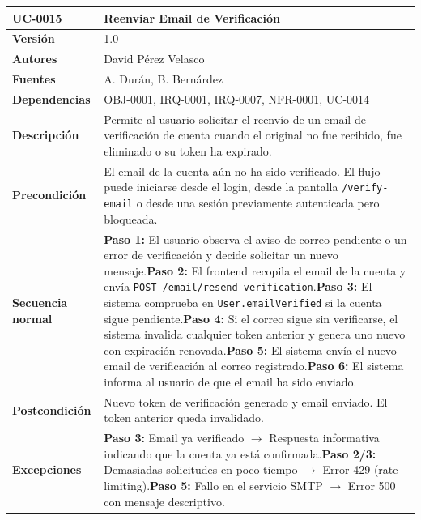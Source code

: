 \documentclass[11pt, a4paper]{article}
\begin{document}
\begin{longtable}{|p{4cm}|p{10cm}|}
\hline
\textbf{UC-0015} & Reenviar Email de Verificación \\
\hline
\textbf{Versión} & 1.0 \\
\hline
\textbf{Autores} & David Pérez Velasco \\
\hline
\textbf{Fuentes} & A. Durán, B. Bernárdez \\
\hline
\textbf{Dependencias} & OBJ-0001, IRQ-0001, IRQ-0007, NFR-0001, UC-0014 \\
\hline
\textbf{Descripción} & Permite al usuario solicitar el reenvío de un email de verificación de cuenta cuando el original no fue recibido, fue eliminado o su token ha expirado. \\
\hline
\textbf{Precondición} & El email de la cuenta aún no ha sido verificado. El flujo puede iniciarse desde el login, desde la pantalla \texttt{/verify-email} o desde una sesión previamente autenticada pero bloqueada. \\
\hline
\textbf{Secuencia normal} & \textbf{Paso 1:} El usuario observa el aviso de correo pendiente o un error de verificación y decide solicitar un nuevo mensaje.\newline\textbf{Paso 2:} El frontend recopila el email de la cuenta y envía \texttt{POST /email/resend-verification}.\newline\textbf{Paso 3:} El sistema comprueba en \texttt{User.emailVerified} si la cuenta sigue pendiente.\newline\textbf{Paso 4:} Si el correo sigue sin verificarse, el sistema invalida cualquier token anterior y genera uno nuevo con expiración renovada.\newline\textbf{Paso 5:} El sistema envía el nuevo email de verificación al correo registrado.\newline\textbf{Paso 6:} El sistema informa al usuario de que el email ha sido enviado. \\
\hline
\textbf{Postcondición} & Nuevo token de verificación generado y email enviado. El token anterior queda invalidado. \\
\hline
\textbf{Excepciones} & \textbf{Paso 3:} Email ya verificado $\rightarrow$ Respuesta informativa indicando que la cuenta ya está confirmada.\newline\textbf{Paso 2/3:} Demasiadas solicitudes en poco tiempo $\rightarrow$ Error 429 (rate limiting).\newline\textbf{Paso 5:} Fallo en el servicio SMTP $\rightarrow$ Error 500 con mensaje descriptivo. \\

\end{longtable}
\end{document}
